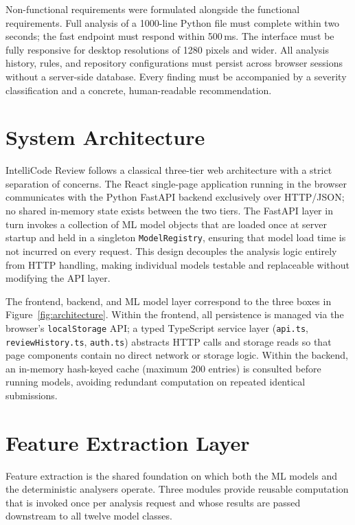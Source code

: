 \documentclass[12pt, oneside]{report}
\begin{document}
Non-functional requirements were formulated alongside the functional requirements.
Full analysis of a 1000-line Python file must complete within two seconds; the fast
endpoint must respond within 500\,ms. The interface must be fully responsive for
desktop resolutions of 1280 pixels and wider. All analysis history, rules, and
repository configurations must persist across browser sessions without a server-side
database. Every finding must be accompanied by a severity classification and a
concrete, human-readable recommendation.

\section{System Architecture}
\label{sec:arch}

IntelliCode Review follows a classical three-tier web architecture with a strict separation
of concerns. The React single-page application running in the browser communicates
with the Python FastAPI backend exclusively over HTTP/JSON; no shared in-memory state
exists between the two tiers. The FastAPI layer in turn invokes a collection of ML model
objects that are loaded once at server startup and held in a singleton
\texttt{ModelRegistry}, ensuring that model load time is not incurred on
every request. This design decouples the analysis logic entirely from HTTP handling,
making individual models testable and replaceable without modifying the API layer.

The frontend, backend, and ML model layer correspond to the three boxes in
Figure~\ref{fig:architecture}. Within the frontend, all persistence is managed via the
browser's \texttt{localStorage} API; a typed TypeScript service layer (\texttt{api.ts},
\texttt{reviewHistory.ts}, \texttt{auth.ts}) abstracts HTTP calls and storage reads so
that page components contain no direct network or storage logic. Within the backend,
an in-memory hash-keyed cache (maximum 200 entries) is consulted before running
models, avoiding redundant computation on repeated identical submissions.

\section{Feature Extraction Layer}
\label{sec:features}

Feature extraction is the shared foundation on which both the ML models and the
deterministic analysers operate. Three modules provide reusable computation that is
invoked once per analysis request and whose results are passed downstream to all
twelve model classes.
\end{document}
